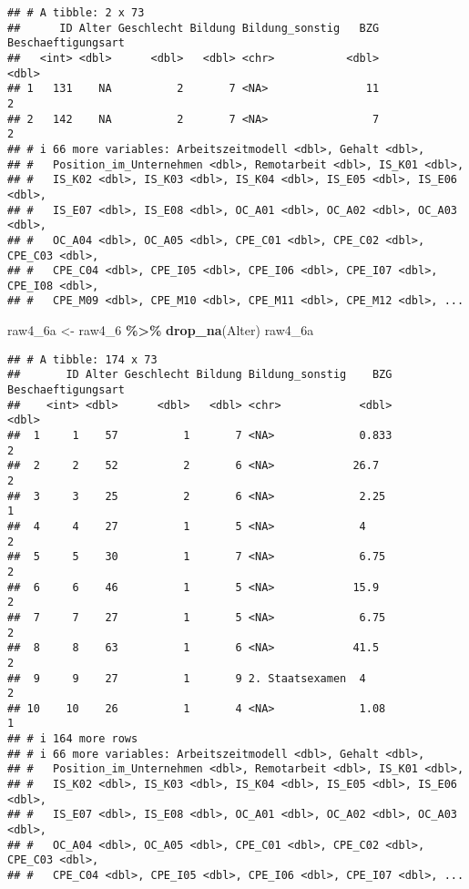 \documentclass[
]{article}
\newenvironment{Shaded}{\begin{snugshade}}{\end{snugshade}}
\newcommand{\FunctionTok}[1]{\textcolor[rgb]{0.13,0.29,0.53}{\textbf{#1}}}
\newcommand{\NormalTok}[1]{#1}
\newcommand{\OtherTok}[1]{\textcolor[rgb]{0.56,0.35,0.01}{#1}}
\newcommand{\SpecialCharTok}[1]{\textcolor[rgb]{0.81,0.36,0.00}{\textbf{#1}}}
\begin{document}
\begin{verbatim}
## # A tibble: 2 x 73
##      ID Alter Geschlecht Bildung Bildung_sonstig   BZG Beschaeftigungsart
##   <int> <dbl>      <dbl>   <dbl> <chr>           <dbl>              <dbl>
## 1   131    NA          2       7 <NA>               11                  2
## 2   142    NA          2       7 <NA>                7                  2
## # i 66 more variables: Arbeitszeitmodell <dbl>, Gehalt <dbl>,
## #   Position_im_Unternehmen <dbl>, Remotarbeit <dbl>, IS_K01 <dbl>,
## #   IS_K02 <dbl>, IS_K03 <dbl>, IS_K04 <dbl>, IS_E05 <dbl>, IS_E06 <dbl>,
## #   IS_E07 <dbl>, IS_E08 <dbl>, OC_A01 <dbl>, OC_A02 <dbl>, OC_A03 <dbl>,
## #   OC_A04 <dbl>, OC_A05 <dbl>, CPE_C01 <dbl>, CPE_C02 <dbl>, CPE_C03 <dbl>,
## #   CPE_C04 <dbl>, CPE_I05 <dbl>, CPE_I06 <dbl>, CPE_I07 <dbl>, CPE_I08 <dbl>,
## #   CPE_M09 <dbl>, CPE_M10 <dbl>, CPE_M11 <dbl>, CPE_M12 <dbl>, ...
\end{verbatim}

\begin{Shaded}
\begin{Highlighting}[]
\NormalTok{raw4\_6a }\OtherTok{\textless{}{-}}\NormalTok{ raw4\_6 }\SpecialCharTok{\%\textgreater{}\%} 
  \FunctionTok{drop\_na}\NormalTok{(Alter) }
\NormalTok{raw4\_6a}
\end{Highlighting}
\end{Shaded}

\begin{verbatim}
## # A tibble: 174 x 73
##       ID Alter Geschlecht Bildung Bildung_sonstig    BZG Beschaeftigungsart
##    <int> <dbl>      <dbl>   <dbl> <chr>            <dbl>              <dbl>
##  1     1    57          1       7 <NA>             0.833                  2
##  2     2    52          2       6 <NA>            26.7                    2
##  3     3    25          2       6 <NA>             2.25                   1
##  4     4    27          1       5 <NA>             4                      2
##  5     5    30          1       7 <NA>             6.75                   2
##  6     6    46          1       5 <NA>            15.9                    2
##  7     7    27          1       5 <NA>             6.75                   2
##  8     8    63          1       6 <NA>            41.5                    2
##  9     9    27          1       9 2. Staatsexamen  4                      2
## 10    10    26          1       4 <NA>             1.08                   1
## # i 164 more rows
## # i 66 more variables: Arbeitszeitmodell <dbl>, Gehalt <dbl>,
## #   Position_im_Unternehmen <dbl>, Remotarbeit <dbl>, IS_K01 <dbl>,
## #   IS_K02 <dbl>, IS_K03 <dbl>, IS_K04 <dbl>, IS_E05 <dbl>, IS_E06 <dbl>,
## #   IS_E07 <dbl>, IS_E08 <dbl>, OC_A01 <dbl>, OC_A02 <dbl>, OC_A03 <dbl>,
## #   OC_A04 <dbl>, OC_A05 <dbl>, CPE_C01 <dbl>, CPE_C02 <dbl>, CPE_C03 <dbl>,
## #   CPE_C04 <dbl>, CPE_I05 <dbl>, CPE_I06 <dbl>, CPE_I07 <dbl>, ...
\end{verbatim}
\end{document}

